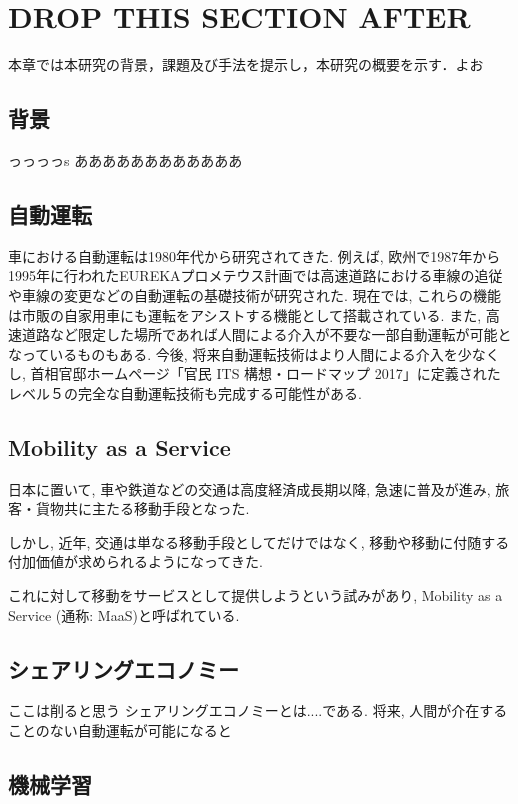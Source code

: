 \chapter{DROP THIS SECTION AFTER}
\label{intoro}


本章では本研究の背景，課題及び手法を提示し，本研究の概要を示す．よお

\section{背景}
\label{intro:background}
っっっっs
ああああああああああああ


\section{自動運転}

車における自動運転は1980年代から研究されてきた.
例えば, 欧州で1987年から1995年に行われたEUREKAプロメテウス計画では高速道路における車線の追従や車線の変更などの自動運転の基礎技術が研究された.
現在では, これらの機能は市販の自家用車にも運転をアシストする機能として搭載されている. また, 高速道路など限定した場所であれば人間による介入が不要な一部自動運転が可能となっているものもある.
今後, 将来自動運転技術はより人間による介入を少なくし, 首相官邸ホームページ「官民 ITS 構想・ロードマップ 2017」に定義されたレベル５の完全な自動運転技術も完成する可能性がある.


\section{Mobility as a Service}

日本に置いて, 車や鉄道などの交通は高度経済成長期以降, 急速に普及が進み, 旅客・貨物共に主たる移動手段となった. 

しかし, 近年, 交通は単なる移動手段としてだけではなく, 移動や移動に付随する付加価値が求められるようになってきた.

これに対して移動をサービスとして提供しようという試みがあり, Mobility as a Service (通称: MaaS)と呼ばれている.

\section{シェアリングエコノミー}

ここは削ると思う
シェアリングエコノミーとは....である. 将来, 人間が介在することのない自動運転が可能になると

\section{機械学習}

